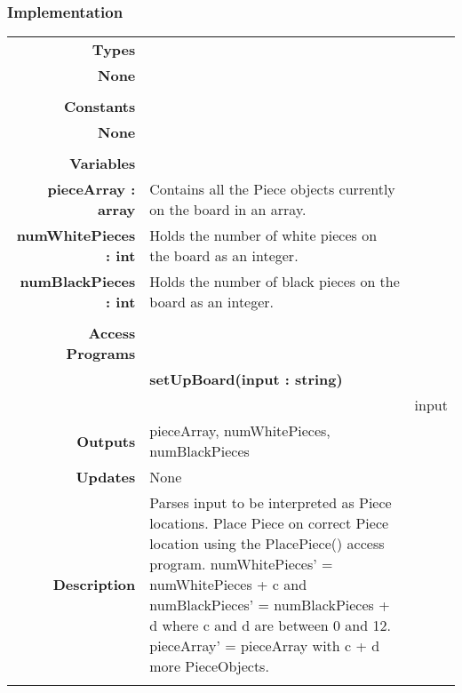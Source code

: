 \documentclass[10pt]{article}
\begin{document}
    \subsubsection{Implementation}
        \begin{tabularx}{\linewidth}{ >{\bfseries}r Xp{2cm} }
            Types           & \begin{tabular}[t]{@{} l p{8cm}} 
                                 & \\
                                None & \\
                                \end{tabular} \\
            Constants       & \begin{tabular}[t]{@{} l p{8cm}} 
                                 & \\
                                None & \\
                            \end{tabular} \\
            Variables       & \begin{tabular}[t]{@{} l p{8cm}} 
                                     & \\
                                    pieceArray : array & Contains all the Piece objects currently on the board in an array. \\
                                    numWhitePieces : int & Holds the number of white pieces on the board as an integer. \\
                                    numBlackPieces : int & Holds the number of black pieces on the board as an integer. \\
                              \end{tabular} \\
            Access Programs & \\
                            & \bf{setUpBoard(input : string)} \\
                            & \begin{tabular}[t]{@{} p{2.5cm} p{10cm}} 
                                    Inputs & input \\
                                    Outputs & pieceArray, numWhitePieces, numBlackPieces \\
                                    Updates & None \\
                                    Description & Parses input to be interpreted as Piece locations. Place Piece on correct Piece location using the PlacePiece() access program. numWhitePieces' = numWhitePieces + c and numBlackPieces' = numBlackPieces + d where c and d are between 0 and 12. pieceArray' = pieceArray with c + d more PieceObjects.\\

\end{tabular}
\end{tabularx}
\end{document}
